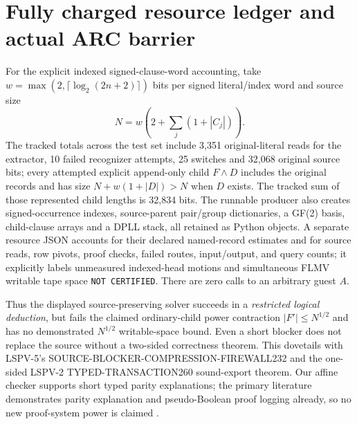 \documentclass[11pt]{article}
\begin{document}
\section{Fully charged resource ledger and actual ARC barrier}
For the explicit indexed signed-clause-word accounting, take $w=\max(2,\lceil\log_2(2n+2)\rceil)$ bits per signed literal/index word and source size
\[
 N=w\left(2+\sum_j(1+|C_j|)\right).
 \tag{6}
\]
The tracked totals across the test set include 3,351 original-literal reads for the extractor, 10 failed recognizer attempts, 25 switches and 32,068 original source bits; every attempted explicit append-only child $F\wedge D$ includes the original records and has size $N+w(1+|D|)>N$ when $D$ exists. The tracked sum of those represented child lengths is 32,834 bits. The runnable producer also creates signed-occurrence indexes, source-parent pair/group dictionaries, a GF(2) basis, child-clause arrays and a DPLL stack, all retained as Python objects. A separate resource JSON accounts for their declared named-record estimates and for source reads, row pivots, proof checks, failed routes, input/output, and query counts; it explicitly labels unmeasured indexed-head motions and simultaneous FLMV writable tape space \texttt{NOT CERTIFIED}. There are zero calls to an arbitrary guest $A$.

Thus the displayed source-preserving solver succeeds in a \emph{restricted logical deduction}, but fails the claimed ordinary-child power contraction $|F'|\le N^{1/2}$ and has no demonstrated $N^{1/2}$ writable-space bound. Even a short blocker does not replace the source without a two-sided correctness theorem. This dovetails with LSPV-5's SOURCE-BLOCKER-COMPRESSION-FIREWALL232 and the one-sided LSPV-2 TYPED-TRANSACTION260 sound-export theorem. Our affine checker supports short typed parity explanations; the primary literature demonstrates parity explanation and pseudo-Boolean proof logging already, so no new proof-system power is claimed \cite{laitinen,gocht}.
\end{document}
